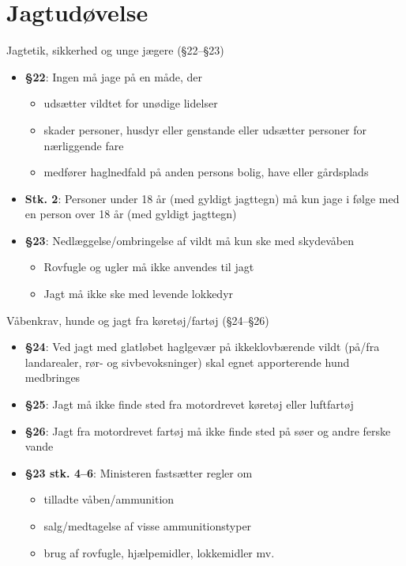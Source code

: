 \section{Jagtudøvelse}



\begin{frame}{Jagtetik, sikkerhed og unge jægere (§22–§23)}
    \begin{itemize}
        \item \textbf{§22}: Ingen må jage på en måde, der
          \begin{itemize}
            \item udsætter vildtet for unødige lidelser
            \item skader personer, husdyr eller genstande eller udsætter personer for nærliggende fare
            \item medfører haglnedfald på anden persons bolig, have eller gårdsplads
          \end{itemize}
        \item \textbf{Stk. 2}: Personer under 18 år (med gyldigt jagttegn) må kun jage i følge med en person over 18 år (med gyldigt jagttegn)
        \item \textbf{§23}: Nedlæggelse/ombringelse af vildt må kun ske med skydevåben
          \begin{itemize}
            \item Rovfugle og ugler må ikke anvendes til jagt
            \item Jagt må ikke ske med levende lokkedyr
          \end{itemize}
    \end{itemize}
\end{frame}

\begin{frame}{Våbenkrav, hunde og jagt fra køretøj/fartøj (§24–§26)}
    \begin{itemize}
        \item \textbf{§24}: Ved jagt med glatløbet haglgevær på ikkeklovbærende vildt (på/fra landarealer, rør- og sivbevoksninger) skal egnet apporterende hund medbringes
        \item \textbf{§25}: Jagt må ikke finde sted fra motordrevet køretøj eller luftfartøj
        \item \textbf{§26}: Jagt fra motordrevet fartøj må ikke finde sted på søer og andre ferske vande
        \item \textbf{§23 stk. 4–6}: Ministeren fastsætter regler om
          \begin{itemize}
            \item tilladte våben/ammunition
            \item salg/medtagelse af visse ammunitionstyper
            \item brug af rovfugle, hjælpemidler, lokkemidler mv.
          \end{itemize}
    \end{itemize}
\end{frame}

